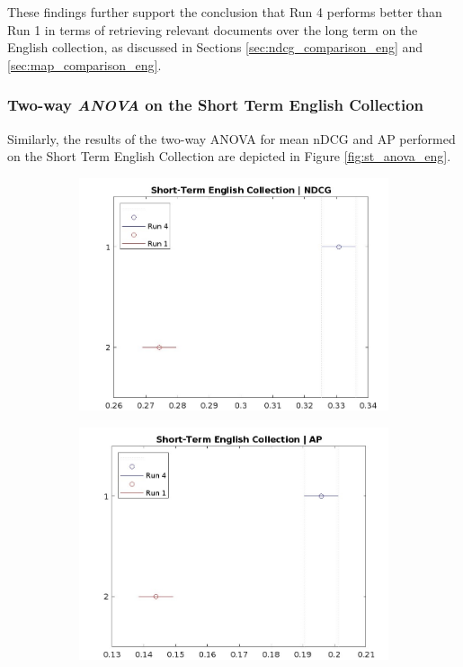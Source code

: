 These findings further support the conclusion that Run 4 performs better than Run 1 in terms of retrieving relevant documents over the long term on the English collection, as discussed in Sections \ref{sec:ndcg_comparison_eng} and \ref{sec:map_comparison_eng}.


\newpage
\enlargethispage{5\baselineskip}
\subsubsection{Two-way \textit{ANOVA} on the Short Term English Collection}

Similarly, the results of the two-way \ac{ANOVA} for mean \ac{nDCG} and \ac{AP} performed on the Short Term English Collection are depicted in Figure \ref{fig:st_anova_eng}.

\begin{figure}[!h]
    \centering
    \begin{subfigure}[b]{0.49\textwidth}
        \includegraphics[width=\textwidth]{figure/StatisticalAnalysis/ANOVA 2/ndcg-st-en.jpeg}
        \label{fig:st_anova_eng_ndcg}        
    \end{subfigure}
    \hfill
    \begin{subfigure}[b]{0.49\textwidth}
        \includegraphics[width=\textwidth]{figure/StatisticalAnalysis/ANOVA 2/ap-st-en.jpeg}

\end{subfigure}
\end{figure}

